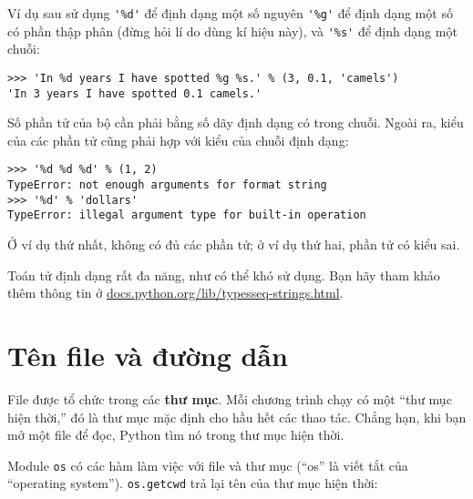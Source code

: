 \documentclass[11pt]{book}
\begin{document}
Ví dụ sau sử dụng \verb"'%d'" để định dạng một số nguyên
\verb"'%g'" để định dạng một số có phần thập phân (đừng hỏi 
lí do dùng kí hiệu này), và \verb"'%s'" để định dạng một chuỗi:

\beforeverb
\begin{verbatim}
>>> 'In %d years I have spotted %g %s.' % (3, 0.1, 'camels')
'In 3 years I have spotted 0.1 camels.'
\end{verbatim}
\afterverb
%
Số phần tử của bộ cần phải bằng số dãy định dạng có trong
chuỗi. Ngoài ra, kiểu của các phần tử cũng phải hợp với kiểu
của chuỗi định dạng:


\beforeverb
\begin{verbatim}
>>> '%d %d %d' % (1, 2)
TypeError: not enough arguments for format string
>>> '%d' % 'dollars'
TypeError: illegal argument type for built-in operation
\end{verbatim}
\afterverb
%
Ở ví dụ thứ nhất, không có đủ các phần tử; ở ví dụ thứ hai,
phần tử có kiểu sai.

Toán tử định dạng rất đa năng, như có thể khó sử dụng. Bạn hãy
tham khảo thêm thông tin ở
\url{docs.python.org/lib/typesseq-strings.html}.




\section{Tên file và đường dẫn}
\label{paths}


File được tổ chức trong các {\bf thư mục}. Mỗi chương trình chạy
có một ``thư mục hiện thời,'' đó là thư mục mặc định cho hầu hết
các thao tác. Chẳng hạn, khi bạn mở một file để đọc, Python tìm
nó trong thư mục hiện thời.


Module {\tt os} có các hàm làm việc với file và thư mục
(``os'' là viết tắt của ``operating system'').  {\tt os.getcwd}
trả lại tên của thư mục hiện thời:
\end{document}
